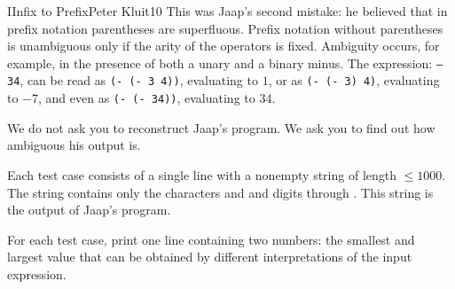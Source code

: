 \begin{icpcproblem}{I}{Infix to Prefix}{Peter Kluit}{10}
This was Jaap's second mistake: he believed that in prefix notation parentheses are superfluous.
Prefix notation without parentheses is unambiguous only if the arity of the operators is fixed. Ambiguity occurs, for example, in the presence of both a unary and a binary minus. The expression:
\texttt{--34}, can be read as \texttt{(- (- 3 4))}, evaluating to $1$, or as \texttt{(- (- 3) 4)}, evaluating to $-7$, and even as \texttt{(- (- 34))}, evaluating to $34$.

We do not ask you to reconstruct Jaap's program. We ask you to find out how ambiguous his output is.


Each test case consists of a single line with a nonempty string of length $\leq 1000$. The string contains only the characters \typeword{+} and \typeword{-} and digits  through . This string is the output of Jaap's program.


For each test case, print one line containing two numbers: the smallest and largest value that can be obtained by different interpretations of the input expression.



\end{icpcproblem}
